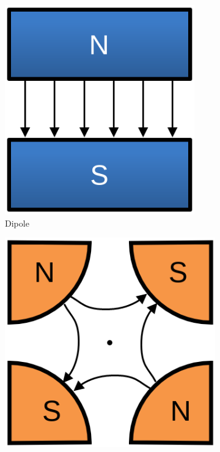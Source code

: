 \begin{figure}
\centering
\begin{subfigure}[t]{0.32\textwidth}
\includegraphics[width=0.9\textwidth]{figures/dipole_example.png}
    \caption{Dipole}
    \label{fig:nperiodic1}
\end{subfigure}
 \begin{subfigure}[t]{0.32\textwidth}
\includegraphics[width=1.0\textwidth]{figures/quadrupole_example.png}

\end{subfigure}
\end{figure}
